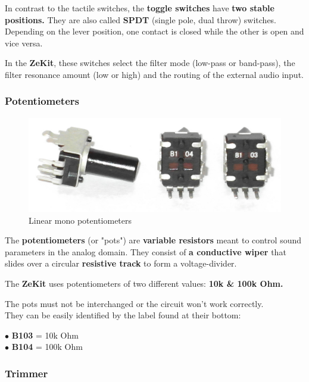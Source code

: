 \documentclass{scrartcl}
\begin{document}
In contrast to the tactile switches, the \textbf{toggle switches} have \textbf{two stable positions.} They are also called \textbf{SPDT} (single pole, dual throw) switches.
Depending on the lever position, one contact is closed while the other is open and vice versa.

In the \textbf{ZeKit}, these switches select the filter mode (low-pass or band-pass), the filter resonance amount (low or high) and the routing of the external audio input.

\subsubsection{Potentiometers}

\begin{figure}[!ht]
    \begin{center}
        \includegraphics[scale=0.25]{assets/zekit-pots.jpg}
        \caption{Linear mono potentiometers}
    \end{center}
\end{figure}

The \textbf{potentiometers} (or "pots") are \textbf{variable resistors} meant to control sound parameters in the analog domain. They consist of \textbf{a conductive wiper} that slides over a circular \textbf{resistive track} to form a voltage-divider.

The \textbf{ZeKit} uses potentiometers of two different values: \textbf{10k \& 100k Ohm.}

The pots must not be interchanged or the circuit won't work correctly. \\
They can be easily identified by the label found at their bottom:

$\bullet$ \textbf{B103} = 10k Ohm\\
$\bullet$ \textbf{B104} = 100k Ohm\\

\subsubsection{Trimmer}
\end{document}
